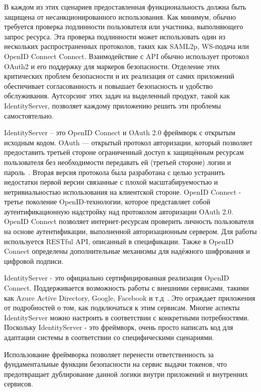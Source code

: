 В каждом из этих сценариев предоставленная функциональность должна быть защищена от несанкционированного использования. Как минимум, обычно требуется проверка подлинности пользователя или участника, выполняющего запрос ресурса. Эта проверка подлинности может использовать один из нескольких распространенных протоколов, таких как SAML2p, WS-подача или OpenID Connect Connect. Взаимодействие с API обычно использует протокол OAuth2 и его поддержку для маркеров безопасности. Отделение этих критических проблем безопасности и их реализация от самих приложений обеспечивает согласованность и повышает безопасность и удобство обслуживания. Аутсорсинг этих задач на выделенный продукт, такой как IdentityServer, позволяет каждому приложению решить эти проблемы самостоятельно.

IdentityServer – это OpenID Connect и OAuth 2.0 фреймворк с открытым исходным кодом. OAuth — открытый протокол авторизации, который позволяет предоставить третьей стороне ограниченный доступ к защищённым ресурсам пользователя без необходимости передавать ей (третьей стороне) логин и пароль~\cite{wiki_oauth}. Вторая версия протокола была разработана с целью устранить недостатки первой версии связанные с плохой масштабируемостью и нетривиальностью использования на клиентской стороне. OpenID Connect - третье поколение OpenID-технологии, которое представляет собой аутентификационную надстройку над протоколом авторизации OAuth 2.0. OpenID Connect позволяет интернет-ресурсам проверить личность пользователя на основе аутентификации, выполненной авторизационным сервером. Для работы используется RESTful API, описанный в спецификации. Также в OpenID Connect определены дополнительные механизмы для надёжного шифрования и цифровой подписи.

IdentityServer - это официально сертифицированная реализация OpenID Connect. Поддерживается возможность работы с внешними сервисами, такими как Azure Active Directory, Google, Facebook и т.д~\cite{wiki_idenityserver}. Это ограждает приложения от подробностей о том, как подключаться к этим сервисам. Многие аспекты IdentityServer можно настроить в соответствии с конкретными потребностями. Поскольку IdentityServer - это фреймворк, очень просто написать код для адаптации системы в соответствии со специфическими сценариями. 

Использование фреймворка позволяет перенести ответственность за фундаментальные функции безопасности на сервис выдачи токенов, что предотвращает дублирование данной логики внутри приложений и внутренних сервисов.


